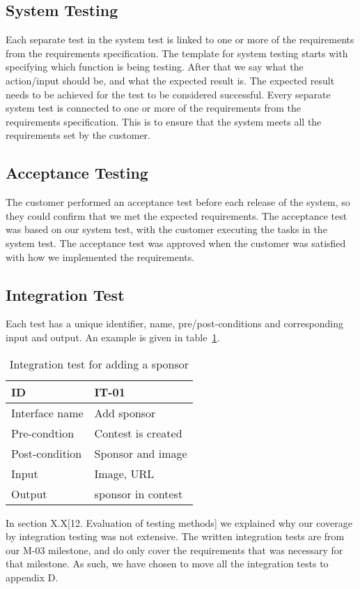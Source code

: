 \subsection{System Testing} Each separate test in the system test is linked to
one or more of the requirements from the requirements specification. The
template for system testing starts with specifying which function is being
testing.  After that we say what the action/input should be, and what the
expected result is. The expected result needs to be achieved for the test to be
considered successful. Every separate system test is connected to one or more
of the requirements from the requirements specification. This is to ensure that
the system meets all the requirements set by the customer.


\subsection{Acceptance Testing}
The customer performed an acceptance test before each release of the system, so
they could confirm that we met the expected requirements.  The acceptance test
was based on our system test, with the customer executing the tasks in the
system test. The acceptance test was approved when the customer was satisfied
with how we implemented the requirements.

\subsection{Integration Test}
Each test has a unique identifier, name, pre/post-conditions and corresponding
input and output. An example is given in table~\ref{table:integrationTest}.

\begin{longtable}{|l|l|}
    \caption{Integration test for adding a sponsor} \label{table:integrationTest}\\
\hline
ID & IT-01\\\hline
Interface name & Add sponsor\\\hline
Pre-condtion & Contest is created\\\hline
Post-condition & Sponsor and image\\\hline
Input & Image, URL\\\hline
Output & sponsor in contest\\\hline
\end{longtable}

In section X.X[12. Evaluation of testing methods] we explained why our coverage
by integration testing was not extensive. The written integration tests are
from our M-03 milestone, and do only cover the requirements that was necessary
for that milestone. As such, we have chosen to move all the integration tests
to appendix D.

